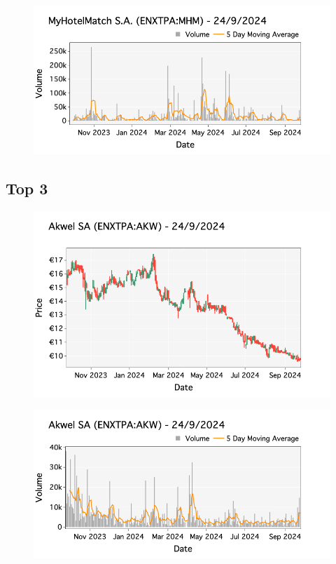 \documentclass[a4paper, twocolumn, 11pt, paperequity]{gorgona}
\begin{document}
\begin{figure}[H]
    \centering
    \includegraphics[width=\columnwidth]{France/images/Top_Volume/Top_2_volume.png}
\end{figure}

\subsection*{Top 3}

\begin{figure}[H]
    \centering
    \includegraphics[width=\columnwidth]{France/images/Top_Volume/Top_3_candlestick.png}
\end{figure}

\begin{figure}[H]
    \centering
    \includegraphics[width=\columnwidth]{France/images/Top_Volume/Top_3_volume.png}
\end{figure}
\end{document}

